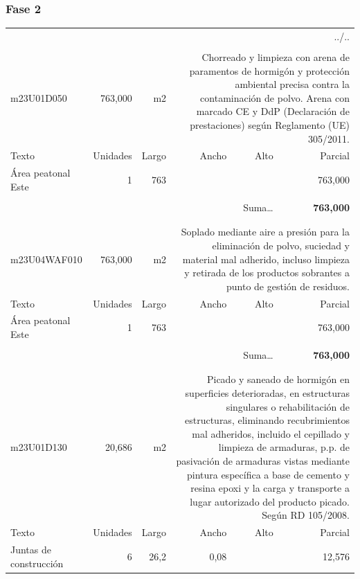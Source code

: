 \documentclass{book}%
\begin{document}
\subsubsection{Fase 2}%
\begin{longtable}{lrrrrr}%
\multicolumn{6}{r}{../..}\\%
\endfoot%
\endlastfoot%
&&&&&\\%
m23U01D050&   763,000& m2&\multicolumn{3}{p{6cm}}{\scriptsize Chorreado y limpieza con arena de paramentos de hormigón y protección ambiental precisa contra la contaminación de polvo. Arena con marcado CE y DdP (Declaración de prestaciones) según Reglamento (UE) 305/2011.\normalsize}\\%
Texto&Unidades&Largo&Ancho&Alto&Parcial\\%
\hline%
\multicolumn{1}{p{3.5cm}}{Área peatonal Este}&1&763&&&   763,000\\%
&&&&&\\%
\multicolumn{5}{r}{Suma\ldots}&\textbf{   763,000}\\%
\hline%
&&&&&\\%
&&&&&\\%
m23U04WAF010&   763,000& m2&\multicolumn{3}{p{6cm}}{\scriptsize Soplado mediante aire a presión para la eliminación de polvo, suciedad y material mal adherido, incluso limpieza y retirada de los productos sobrantes a punto de gestión de residuos.\normalsize}\\%
Texto&Unidades&Largo&Ancho&Alto&Parcial\\%
\hline%
\multicolumn{1}{p{3.5cm}}{Área peatonal Este}&1&763&&&   763,000\\%
&&&&&\\%
\multicolumn{5}{r}{Suma\ldots}&\textbf{   763,000}\\%
\hline%
&&&&&\\%
&&&&&\\%
m23U01D130&    20,686& m2&\multicolumn{3}{p{6cm}}{\scriptsize Picado y saneado de hormigón en superficies deterioradas, en estructuras singulares o rehabilitación de estructuras, eliminando recubrimientos mal adheridos, incluido el cepillado y limpieza de armaduras, p.p. de pasivación de armaduras vistas mediante pintura específica a base de cemento y resina epoxi y la carga y transporte a lugar autorizado del producto picado. Según RD 105/2008.\normalsize}\\%
Texto&Unidades&Largo&Ancho&Alto&Parcial\\%
\hline%
\multicolumn{1}{p{3.5cm}}{Juntas de construcción}&6&26,2&0,08&&    12,576\\%

\end{longtable}
\end{document}
